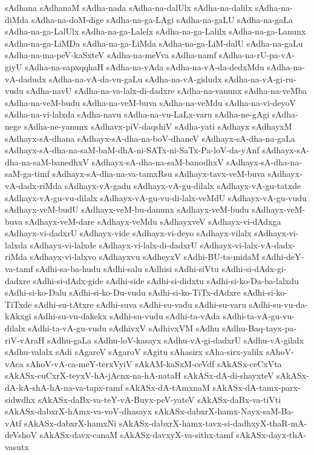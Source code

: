 {sAdhana
sAdhanaM
sAdha-nada
sAdha-na-dalUlx
sAdha-na-dalilx
sAdha-na-diMda
sAdha-na-doM-dige
sAdha-na-ga-LAgi
sAdha-na-gaLU
sAdha-na-gaLa
sAdha-na-ga-LalUlx
sAdha-na-ga-Lalelx
sAdha-na-ga-Lalilx
sAdha-na-ga-Lanunx
sAdha-na-ga-LiMDa
sAdha-na-ga-LiMda
sAdha-na-ga-LiM-dalU
sAdha-na-gaLu
sAdha-na-ma-peV-kaSxteV
sAdha-na-meVva
sAdha-namf
sAdha-na-rU-pa-vA-giyU
sAdha-na-sapxqqhaH
sAdha-na-vAda
sAdha-na-vA-da-dedxMdu
sAdha-na-vA-dadudx
sAdha-na-vA-da-vu-gaLu
sAdha-na-vA-gidudx
sAdha-na-vA-gi-ru-vudu
sAdha-navU
sAdha-na-va-lalx-di-dadxre
sAdha-na-vanunx
sAdha-na-veMba
sAdha-na-veM-budu
sAdha-na-veM-buva
sAdha-na-veMdu
sAdha-na-vi-deyoV
sAdha-na-vi-lalxda
sAdha-navu
sAdha-na-vu-LaLx-varu
sAdha-ne-gAgi
sAdha-nege
sAdha-ne-yanunx
sAdhavx-piV-daqshiV
sAdha-yati
sAdhayx
sAdhayxM
sAdhayx-sA-dhana
sAdhayx-sA-dha-na-boV-dhaneV
sAdhayx-sA-dha-na-gaLa
sAdhayx-sA-dha-na-saM-baM-dhA-ni-SATx-ni-SaTx-Pa-loV-da-yAnf
sAdhayx-sA-dha-na-saM-banedhxV
sAdhayx-sA-dha-na-saM-banodhxV
sAdhayx-sA-dha-na-saM-ga-timf
sAdhayx-sA-dha-na-va-tamxRsu
sAdhayx-tavx-veM-buva
sAdhayx-vA-dadx-riMda
sAdhayx-vA-gadu
sAdhayx-vA-gu-dilalx
sAdhayx-vA-gu-tatxde
sAdhayx-vA-gu-vu-dilalx
sAdhayx-vA-gu-vu-di-lalx-veMdU
sAdhayx-vA-gu-vudu
sAdhayx-veM-budU
sAdhayx-veM-bu-danunx
sAdhayx-veM-budu
sAdhayx-veM-buva
sAdhayx-veM-dare
sAdhayx-veMdu
sAdhayxveV
sAdhayx-vi-dAdxga
sAdhayx-vi-dadxrU
sAdhayx-vide
sAdhayx-vi-deyo
sAdhayx-vilalx
sAdhayx-vi-lalxda
sAdhayx-vi-lalxde
sAdhayx-vi-lalx-di-dadxrU
sAdhayx-vi-lalx-vA-dadx-riMda
sAdhayx-vi-lalxvo
sAdhayxvu
sAdheyxV
sAdhi-BU-ta-midaM
sAdhi-deY-va-tamf
sAdhi-sa-ba-hudu
sAdhi-salu
sAdhisi
sAdhi-siVtu
sAdhi-si-dAdx-gi-dadxre
sAdhi-si-dAdx-gide
sAdhi-side
sAdhi-si-didxtu
sAdhi-si-ko-Da-ba-lalxdu
sAdhi-si-ko-Dalu
sAdhi-si-ko-Du-vudu
sAdhi-si-ko-TiTx-dAdxre
sAdhi-si-ko-TiTxde
sAdhi-su-tAtxre
sAdhi-suva
sAdhi-su-vadu
sAdhi-su-varu
sAdhi-su-vu-da-kAkxgi
sAdhi-su-vu-dakekx
sAdhi-su-vudu
sAdhi-ta-vAda
sAdhi-ta-vA-gu-vu-dilalx
sAdhi-ta-vA-gu-vudu
sAdhivxV
sAdhivxVM
sAdhu
sAdhu-Baq-tayx-pa-riV-vAraH
sAdhu-gaLa
sAdhu-loV-kasayx
sAdhu-vA-gi-dadxrU
sAdhu-vA-gilalx
sAdhu-valalx
sAdi
sAgareV
sAgaroV
sAgitu
sAhasirx
sAha-sirx-yalilx
sAhoV-vAca
sAhoV-vA-ca-meY-terxVyiV
sAkAM-kaSxM-ceVdf
sAkASx-ceCxVta
sAkASx-cuCxrX-teyxV-hA-jAcnx-na-hA-nataH
sAkASx-dA-di-shayxteV
sAkASx-dA-kA-shA-hA-na-va-tapx-ramf
sAkASx-dA-tAmxnaM
sAkASx-dA-tamx-parx-sidwdhx
sAkASx-daBx-va-teY-vA-Buyx-peV-yateV
sAkASx-daBx-va-tiVti
sAkASx-dabxrX-hAmx-va-voV-dhasayx
sAkASx-dabxrX-hamx-Nayx-saM-Ba-vAtf
sAkASx-dabxrX-hamxNi
sAkASx-dabxrX-hamx-tavx-si-dadhxyX-thaR-mA-deVshoV
sAkASx-davx-canaM
sAkASx-davxyX-va-sithx-tamf
sAkASx-dayx-thA-vasutx
}
